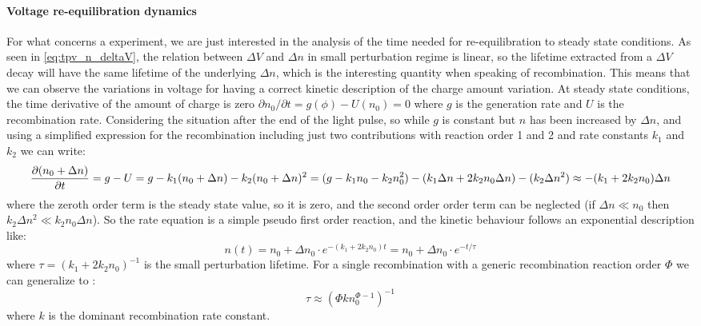 		\paragraph{Voltage re\hyp{}equilibration dynamics}
		For what concerns a  experiment, we are just interested in the analysis of the time needed for re\hyp{}equilibration to steady state conditions.
		As seen in \cref{eq:tpv_n_deltaV}, the relation between $\Delta V$ and $\Delta n$ in small perturbation regime is linear, so the lifetime extracted from a $\Delta V$ decay will have the same lifetime of the underlying $\Delta n$, which is the interesting quantity when speaking of recombination.
		This means that we can observe the variations in voltage for having a correct kinetic description of the charge amount variation.
		At steady state conditions, the time derivative of the amount of charge is zero $\partial n_0 / \partial t = g(\phi) - U(n_0) = 0$ where $g$ is the generation rate and $U$ is the recombination rate.
		Considering the situation after the end of the light pulse, so while $g$ is constant but $n$ has been increased by $\Delta n$, and using a simplified expression for the recombination including just two contributions with reaction order 1 and 2 and rate constants $k_1$ and $k_2$ we can write:
		\begin{dmath}
			\pdv{(n_0 + \Delta n)}{t} = g - U = g - k_1(n_0 + \Delta n) - k_2(n_0 + \Delta n)^2 = (g - k_1 n_0 - k_2 n_0^2) - (k_1 \Delta n + 2 k_2 n_0 \Delta n) - (k_2 \Delta n ^2) \approx - (k_1 + 2 k_2 n_0 ) \Delta n
		\end{dmath}
		where the zeroth order term is the steady state value, so it is zero, and the second order order term can be neglected (if $\Delta n \ll n_0$ then $k_2 \Delta n^2 \ll k_2 n_0 \Delta n$).
		So the rate equation is a simple pseudo first order reaction, and the kinetic behaviour follows an exponential description like:
		\begin{equation}\label{eq:tpv_monoexp}
			n (t) = n_0 + \Delta n_0 \cdot e^{-(k_1 + 2 k_2 n_0) t} = n_0 + \Delta n_0 \cdot e^{-t / \tau}
		\end{equation}
		where $\tau = (k_1 + 2 k_2 n_0)^{-1}$ is the small perturbation lifetime.
		For a single recombination with a generic recombination reaction order $\Phi$ we can generalize to \cite{Shuttle2008}:
		\begin{equation}\label{eq:tpv_tau_order}
			\tau \approx (\Phi k n_0^{\Phi-1})^{-1}
		\end{equation}
		where $k$ is the dominant recombination rate constant.

